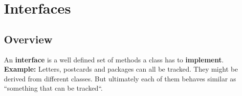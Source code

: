 


\section{Interfaces}
\subsection{Overview}
\begin{frame}{}
    An \textbf{interface} is a well defined set of methods a class has to \textbf{implement}.
    \vfill
    \textbf{Example:}
    Letters, postcards and packages can all be tracked. They might be derived from different classes.
    But ultimately each of them behaves similar as ``something that can be tracked``.
    
\end{frame}
